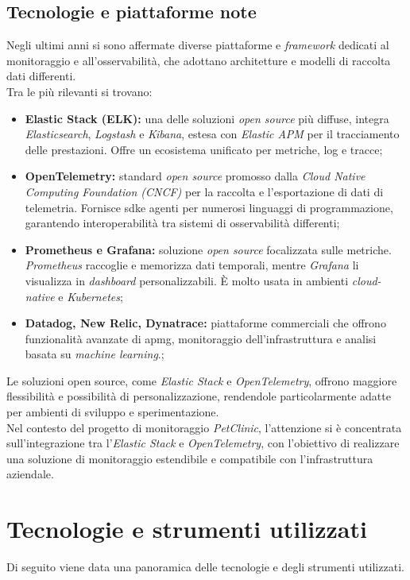 \subsection{Tecnologie e piattaforme note}
Negli ultimi anni si sono affermate diverse piattaforme e \emph{framework} dedicati al monitoraggio e all'osservabilità, che adottano architetture e modelli di raccolta dati differenti. \\
Tra le più rilevanti si trovano:
\begin{itemize}
\item \textbf{Elastic Stack (ELK):} una delle soluzioni \emph{open source} più diffuse, integra \emph{Elasticsearch}, \emph{Logstash} e \emph{Kibana}, estesa con \emph{Elastic APM} per il tracciamento delle prestazioni. Offre un ecosistema unificato per metriche, log e tracce;

\item \textbf{OpenTelemetry:} standard \emph{open source} promosso dalla \emph{Cloud Native Computing Foundation (CNCF)} per la raccolta e l'esportazione di dati di telemetria. Fornisce \gls{sdk}\glsfirstoccur e agenti per numerosi linguaggi di programmazione, garantendo interoperabilità tra sistemi di osservabilità differenti;

\item \textbf{Prometheus e Grafana:} soluzione \emph{open source} focalizzata sulle metriche. \emph{Prometheus} raccoglie e memorizza dati temporali, mentre \emph{Grafana} li visualizza in \emph{dashboard} personalizzabili. È molto usata in ambienti \emph{cloud-native} e \emph{Kubernetes};

\item \textbf{Datadog, New Relic, Dynatrace:} piattaforme commerciali che offrono funzionalità avanzate di \gls{apmg}, monitoraggio dell'infrastruttura e analisi basata su \emph{machine learning}.;
\end{itemize}
Le soluzioni open source, come \emph{Elastic Stack} e \emph{OpenTelemetry}, offrono maggiore flessibilità e possibilità di personalizzazione, rendendole particolarmente adatte per ambienti di sviluppo e sperimentazione. \\
Nel contesto del progetto di monitoraggio \emph{PetClinic}, l'attenzione si è concentrata sull'integrazione tra l'\emph{Elastic Stack} e \emph{OpenTelemetry}, con l'obiettivo di realizzare una soluzione di monitoraggio estendibile e compatibile con l'infrastruttura aziendale.


\section{Tecnologie e strumenti utilizzati}
\label{sec:tecnologie-strumenti}
Di seguito viene data una panoramica delle tecnologie e degli strumenti utilizzati.

